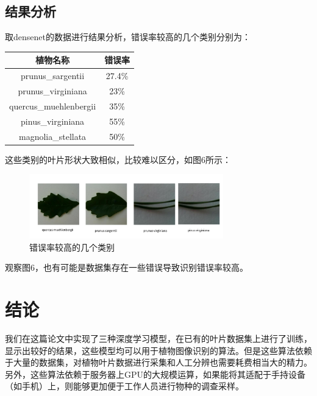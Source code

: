 \documentclass[a4paper]{ctexart} %
\begin{document}
\subsection*{结果分析}

取densenet的数据进行结果分析，错误率较高的几个类别分别为：
\begin{center}
	\begin{tabular}{|c|c|}
		\hline 植物名称&错误率\\
		\hline prunus\_sargentii&27.4\%\\
		\hline prunus\_virginiana&23\%\\
		\hline quercus\_muehlenbergii&35\%\\
		\hline pinus\_virginiana&55\%\\
		\hline magnolia\_stellata&50\%\\
		\hline
	\end{tabular}
\end{center}
这些类别的叶片形状大致相似，比较难以区分，如图6所示：
	\begin{figure}[htbp]
		\centering
		\includegraphics[width=0.75\textwidth]{img3.png}
		\caption{错误率较高的几个类别}
		\label{figure}
	\end{figure}

观察图6，也有可能是数据集存在一些错误导致识别错误率较高。


\section*{结论}
我们在这篇论文中实现了三种深度学习模型，在已有的叶片数据集上进行了训练，显示出较好的结果，这些模型均可以用于植物图像识别的算法。但是这些算法依赖于大量的数据集，对植物叶片数据进行采集和人工分辨也需要耗费相当大的精力。另外，这些算法依赖于服务器上GPU的大规模运算，如果能将其适配于手持设备（如手机）上，则能够更加便于工作人员进行物种的调查采样。



\printbibliography[heading=none]
\end{document}
